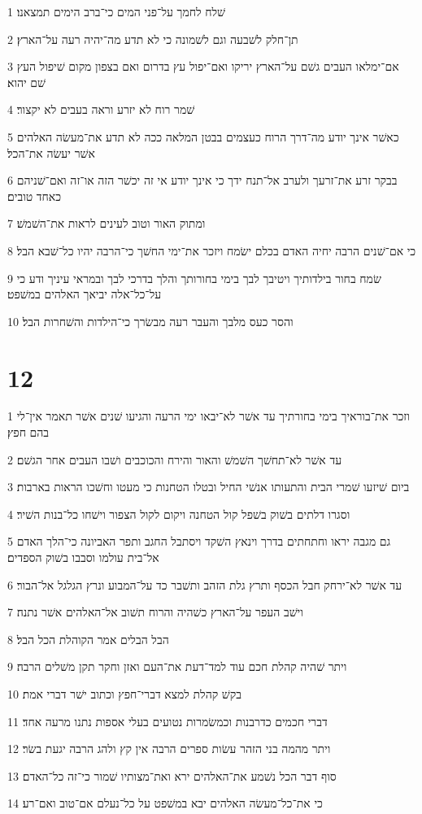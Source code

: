 \par 1 שׁלח לחמך על־פני המים כי־ברב הימים תמצאנו׃
\par 2 תן־חלק לשׁבעה וגם לשׁמונה כי לא תדע מה־יהיה רעה על־הארץ׃
\par 3 אם־ימלאו העבים גשׁם על־הארץ יריקו ואם־יפול עץ בדרום ואם בצפון מקום שׁיפול העץ שׁם יהוא׃
\par 4 שׁמר רוח לא יזרע וראה בעבים לא יקצור׃
\par 5 כאשׁר אינך יודע מה־דרך הרוח כעצמים בבטן המלאה ככה לא תדע את־מעשׂה האלהים אשׁר יעשׂה את־הכל׃
\par 6 בבקר זרע את־זרעך ולערב אל־תנח ידך כי אינך יודע אי זה יכשׁר הזה או־זה ואם־שׁניהם כאחד טובים׃
\par 7 ומתוק האור וטוב לעינים לראות את־השׁמשׁ׃
\par 8 כי אם־שׁנים הרבה יחיה האדם בכלם ישׂמח ויזכר את־ימי החשׁך כי־הרבה יהיו כל־שׁבא הבל׃
\par 9 שׂמח בחור בילדותיך ויטיבך לבך בימי בחורותך והלך בדרכי לבך ובמראי עיניך ודע כי על־כל־אלה יביאך האלהים במשׁפט׃
\par 10 והסר כעס מלבך והעבר רעה מבשׂרך כי־הילדות והשׁחרות הבל׃

\chapter{12}

\par 1 וזכר את־בוראיך בימי בחורתיך עד אשׁר לא־יבאו ימי הרעה והגיעו שׁנים אשׁר תאמר אין־לי בהם חפץ׃
\par 2 עד אשׁר לא־תחשׁך השׁמשׁ והאור והירח והכוכבים ושׁבו העבים אחר הגשׁם׃
\par 3 ביום שׁיזעו שׁמרי הבית והתעותו אנשׁי החיל ובטלו הטחנות כי מעטו וחשׁכו הראות בארבות׃
\par 4 וסגרו דלתים בשׁוק בשׁפל קול הטחנה ויקום לקול הצפור וישׁחו כל־בנות השׁיר׃
\par 5 גם מגבה יראו וחתחתים בדרך וינאץ השׁקד ויסתבל החגב ותפר האביונה כי־הלך האדם אל־בית עולמו וסבבו בשׁוק הספדים׃
\par 6 עד אשׁר לא־ירחק חבל הכסף ותרץ גלת הזהב ותשׁבר כד על־המבוע ונרץ הגלגל אל־הבור׃
\par 7 וישׁב העפר על־הארץ כשׁהיה והרוח תשׁוב אל־האלהים אשׁר נתנה׃
\par 8 הבל הבלים אמר הקוהלת הכל הבל׃
\par 9 ויתר שׁהיה קהלת חכם עוד למד־דעת את־העם ואזן וחקר תקן משׁלים הרבה׃
\par 10 בקשׁ קהלת למצא דברי־חפץ וכתוב ישׁר דברי אמת׃
\par 11 דברי חכמים כדרבנות וכמשׂמרות נטועים בעלי אספות נתנו מרעה אחד׃
\par 12 ויתר מהמה בני הזהר עשׂות ספרים הרבה אין קץ ולהג הרבה יגעת בשׂר׃
\par 13 סוף דבר הכל נשׁמע את־האלהים ירא ואת־מצותיו שׁמור כי־זה כל־האדם׃
\par 14 כי את־כל־מעשׂה האלהים יבא במשׁפט על כל־נעלם אם־טוב ואם־רע׃


